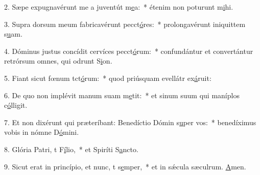 2. Sæpe expugnavérunt me a juventút m\uline{e}a:~* étenim non poturunt m\uline{i}hi.\par 
3. Supra dorsum meum fabricavérunt pecct\uline{ó}res:~* prolongavérunt iniquittem s\uline{u}am.\par 
4. Dóminus justus concídit cervíces pecct\uline{ó}rum:~* confundántur et convertántur retrórsum omnes, qui odrunt S\uline{i}on.\par 
5. Fiant sicut fœnum tct\uline{ó}rum:~* quod priúsquam evellátr ex\uline{á}ruit:\par 
6. De quo non implévit manum suam  m\uline{e}tit:~* et sinum suum qui maníplos c\uline{ó}lligit.\par 
7. Et non dixérunt qui præteríbant: Benedíctio Dómin s\uline{u}per vos:~* benedíximus vobis in nómne D\uline{ó}mini.\par 
8. Glória Patri, t F\uline{í}lio,~* et Spiríti S\uline{a}ncto.\par 
9. Sicut erat in princípio, et nunc, t s\uline{e}mper,~* et in sǽcula sæculrum. \uline{A}men.\par 

